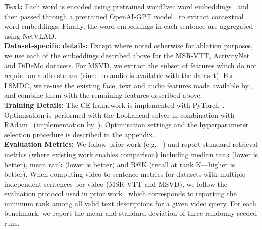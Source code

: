 \documentclass{bmvc2k}
\begin{document}
\textbf{Text:} Each word is encoded using pretrained word2vec word embeddings~\cite{mikolov2013efficient} and then passed through a pretrained OpenAI-GPT model~\cite{radford2018improving} to extract contextual word embeddings. Finally, the word embeddings in each sentence are aggregated using NetVLAD. \\
\noindent \textbf{Dataset-specific details:} Except where noted otherwise for ablation purposes, we use each of the embeddings described above for the MSR-VTT, ActivityNet and DiDeMo datasets. For MSVD, we extract the subset of features which do not require an audio stream (since no audio is available with the dataset).  For LSMDC, we re-use the existing face, text and audio features made available by \cite{miech2018learning}, and combine them with the remaining features described above. \\
\noindent \textbf{Training Details:} The CE framework is implemented with PyTorch~\cite{paszke2017automatic}.  Optimisation is performed with the Lookahead solver \cite{kingma2014adam} in combination with RAdam~\cite{liu2019variance} (implementation by~\cite{LessWright}).  Optimisation settings and the hyperparameter selection procedure is described in the appendix. \\
\noindent \textbf{Evaluation Metrics:} We follow prior work (e.g. ~\cite{dong2016word2visualvec,zhang2018cross,mithun2018learning,yu2018joint,miech2018learning}) and report standard retrieval metrics (where existing work enables comparison) including median rank (lower is better), mean rank (lower is better) and R@K (recall at rank K---higher is better).  When computing video-to-sentence metrics for datasets with multiple independent sentences per video (MSR-VTT and MSVD), we follow the evaluation protocol used in prior work~\cite{mithun2018learning,dong2018predicting,dong2018dual} which corresponds to reporting the minimum rank among all valid text descriptions for a given video query.  For each benchmark, we report the mean and standard deviation of three randomly seeded runs.
\end{document}
